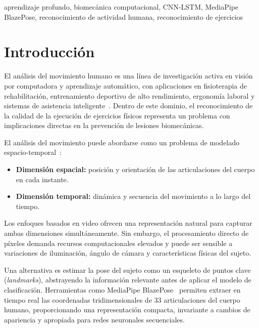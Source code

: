 \documentclass[conference]{IEEEtran}
\begin{document}
\begin{IEEEkeywords}
aprendizaje profundo, biomecánica computacional, CNN-LSTM,
MediaPipe BlazePose, reconocimiento de actividad humana,
reconocimiento de ejercicios
\end{IEEEkeywords}

\section{Introducción}
\label{sec:intro}

El análisis del movimiento humano es una línea de investigación
activa en visión por computadora y aprendizaje automático, con
aplicaciones en fisioterapia de rehabilitación, entrenamiento
deportivo de alto rendimiento, ergonomía laboral y sistemas de
asistencia inteligente~\cite{ren2020survey}. Dentro de este
dominio, el reconocimiento de la calidad de la ejecución de
ejercicios físicos representa un problema con implicaciones
directas en la prevención de lesiones biomecánicas.

El análisis del movimiento puede abordarse como un problema de
modelado espacio-temporal~\cite{ren2020survey}:

\begin{itemize}
  \item \textbf{Dimensión espacial:} posición y orientación de
        las articulaciones del cuerpo en cada instante.
  \item \textbf{Dimensión temporal:} dinámica y secuencia del
        movimiento a lo largo del tiempo.
\end{itemize}

Los enfoques basados en video ofrecen una representación natural
para capturar ambas dimensiones simultáneamente. Sin embargo, el
procesamiento directo de píxeles demanda recursos computacionales
elevados y puede ser sensible a variaciones de iluminación,
ángulo de cámara y características físicas del sujeto.

Una alternativa es estimar la pose del sujeto como un esqueleto
de puntos clave (\textit{landmarks}), abstrayendo la información
relevante antes de aplicar el modelo de clasificación. Herramientas
como MediaPipe BlazePose~\cite{mediapipe2024} permiten extraer en
tiempo real las coordenadas tridimensionales de 33 articulaciones
del cuerpo humano, proporcionando una representación compacta,
invariante a cambios de apariencia y apropiada para redes
neuronales secuenciales.
\end{document}

